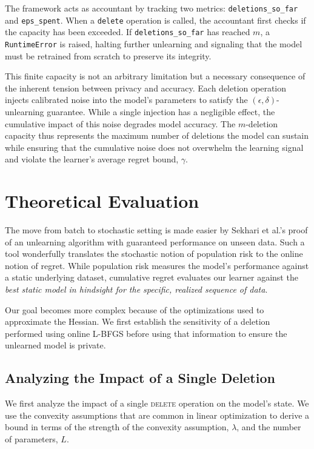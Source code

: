 \documentclass[a4paper,12pt]{article}
\begin{document}
The framework acts as accountant by tracking two metrics: \texttt{deletions\_so\_far} and \texttt{eps\_spent}. When a \texttt{delete} operation is called, the accountant first checks if the capacity has been exceeded. If \texttt{deletions\_so\_far} has reached $m$, a \texttt{RuntimeError} is raised, halting further unlearning and signaling that the model must be retrained from scratch to preserve its integrity.

This finite capacity is not an arbitrary limitation but a necessary consequence of the inherent tension between privacy and accuracy. Each deletion operation injects calibrated noise into the model's parameters to satisfy the $(\epsilon, \delta)$-unlearning guarantee. While a single injection has a negligible effect, the cumulative impact of this noise degrades model accuracy. The $m$-deletion capacity thus represents the maximum number of deletions the model can sustain while ensuring that the cumulative noise does not overwhelm the learning signal and violate the learner's average regret bound, $\gamma$.

\section{Theoretical Evaluation}
\label{sec:theory}

The move from batch to stochastic setting is made easier by Sekhari et al.'s  proof of an unlearning algorithm with guaranteed performance on unseen data. Such a tool wonderfully translates the stochastic notion of population risk to the online notion of regret. While population risk measures the model's performance against a static underlying dataset, cumulative regret evaluates our learner against the \textit{best static model in hindsight for the specific, realized sequence of data}.

Our goal becomes more complex because of the optimizations used to approximate the Hessian. We first establish the sensitivity of a deletion performed using online L-BFGS before using that information to ensure the unlearned model is private.

\subsection{Analyzing the Impact of a Single Deletion}

We first analyze the impact of a single \textsc{delete} operation on the model's state. We use the convexity assumptions that are common in linear optimization to derive a bound in terms of the strength of the convexity assumption, $\lambda$, and the number of parameters, $L$.
\end{document}
